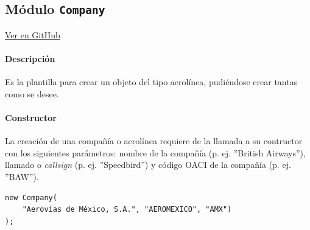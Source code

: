 \subsection{Módulo \texttt{Company}}
\label{subsec:ClaseCompany}

\vspace{-0.85cm}
\begin{flushright}
\href{https://github.com/macgyver912/atc-simulator/blob/jaime/Assets/Scripts/companies/Company.cs}{Ver en GitHub \faGithub}
\end{flushright}

\paragraph{Descripción} \phantom{\newline}

Es la plantilla para crear un objeto del tipo aerolínea, pudiéndose crear tantas como se desee.

\paragraph{Constructor} \phantom{\newline}

La creación de una compañía o aerolínea requiere de la llamada a su contructor con los siguientes parámetros: nombre de la compañía (p. ej. ''British Airways''), llamado o \textit{callsign} (p. ej. ''Speedbird'') y código OACI de la compañía (p. ej. ''BAW'').

\begin{table}[!hbtp]
	\caption{Ejemplo de instancia al constructor de la clase \texttt{Company}.}
	\label{tab:EjemploCompany}
\end{table}
\vspace{-0.8cm}
\begin{scriptsize}
\begin{Verbatim}[frame=single]
new Company(
    "Aerovías de México, S.A.", "AEROMEXICO", "AMX")
);
\end{Verbatim}
\end{scriptsize}






\clearpage

